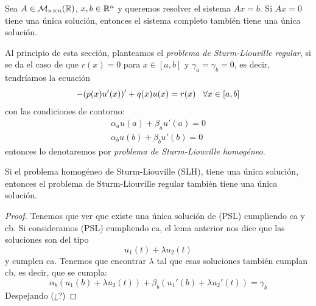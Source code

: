 \begin{remark}
Sea $A\in\mathcal{M}_{n\times n}(\mathbb{R})$, $x,b\in\mathbb{R}^n$ y queremos resolver el sistema $Ax=b$. Si $Ax=0$  tiene una única solución, entonces el sistema completo también tiene una única solución.
\end{remark}

Al principio de esta sección, planteamos el \textit{problema de Sturm-Liouville regular}, si se da el caso de que $r(x)=0$ para $x\in[a,b]$ y $\gamma_a=\gamma_b=0$, es decir, tendríamos la ecuación
\[
-(p(x)u'(x))'+q(x)u(x)=r(x) \;\;\; \forall x\in[a,b]
\]
con las condiciones de contorno:
\[
\begin{array}{c}
\alpha_au(a)+\beta_au'(a)=0\\
\alpha_bu(b)+\beta_bu'(b)=0
\end{array}
\]
entonces lo denotaremos por \textit{problema de Sturm-Liouville homogéneo}.

\begin{theorem}
Si el problema homogéneo de Sturm-Liouville (SLH), tiene una única solución, entonces el problema de Sturm-Liouville regular también tiene una única solución.
\end{theorem}
\begin{proof}
Tenemos que ver que existe una única solución de (PSL) cumpliendo ca y cb. Si consideramos (PSL) cumpliendo ca, el lema anterior nos dice que las soluciones son del tipo 
\[
u_1(t)+\lambda u_2(t)
\]
y cumplen ca. Tenemos que encontrar $\lambda$ tal que esas soluciones también cumplan cb, es decir, que se cumpla:
\[
\alpha_b(u_1(b)+\lambda u_2(t))+\beta_b(u_1'(b)+\lambda u_2'(t))=\gamma_b
\]
Despejando (¿?)
\end{proof}

